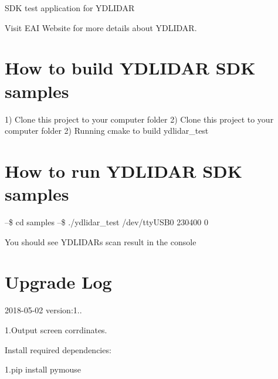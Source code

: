 S\+DK test application for Y\+D\+L\+I\+D\+AR

Visit E\+AI Website for more details about Y\+D\+L\+I\+D\+AR.

\section*{How to build Y\+D\+L\+I\+D\+AR S\+DK samples }

1) Clone this project to your computer folder 2) Clone this project to your computer folder 2) Running cmake to build ydlidar\+\_\+test

\section*{How to run Y\+D\+L\+I\+D\+AR S\+DK samples }

--\$ cd samples --\$ ./ydlidar\+\_\+test /dev/tty\+U\+S\+B0 230400 0

You should see Y\+D\+L\+I\+D\+AR\textquotesingle{}s scan result in the console

\section*{Upgrade Log }

2018-\/05-\/02 version\+:1..

1.\+Output screen corrdinates.

Install required dependencies\+:

1.\+pip install pymouse 